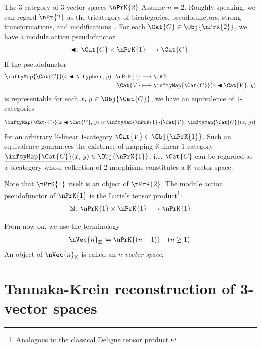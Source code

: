 \documentclass[TQFT_main]{subfiles}
\begin{document}
\begin{myexample}[label=ex:2PrC]{The 3-category of 3-vector spaces $\nPrK{2}$}
    Assume $n=2$.
    Roughly speaking, we can regard $\nPr{2}$ as the tricategory of bicategories, pseudofunctors, strong transformations, and modifications~\cite{Yau2020bicategory}.
    For each $\Cat{C} \in \Obj{\nPrK{2}}$, we have a module action pseudofunctor
    \begin{align}
        \btl \colon \Cat{C} \times \nPrK{1} \lto \Cat{C}.
    \end{align}
    If the pseudofunctor 
    \begin{align}
        \inftyMap{\Cat{C}} (x \btl \, \mhyphen \, ,\, y) \colon 
        \nPrK{1} &\lto \CAT, \\
        \Cat{V} &\lmto \inftyMap{\Cat{C}} (x \btl \Cat{V},\, y)
    \end{align}
    is representable for each $x,\, y \in \Obj{\Cat{C}}$, we have an equivalence of $1$-categories
    \begin{align}
        \inftyMap{\Cat{C}} (x \btl \Cat{V},\, y) \simeq \inftyMap{\nPrK{1}} \bigl(\Cat{V},\,  \underline{\inftyMap{\Cat{C}}} (x,\, y)\bigr)
    \end{align}
    for an arbitrary $\mathbb{K}$-linear $1$-category $\Cat{V} \in \Obj{\nPrK{1}}$.
    Such an equivalence guarantees the existence of mapping $\mathbb{K}$-linear $1$-category $\underline{\inftyMap{\Cat{C}}}(x,\, y) \in \Obj{\nPrK{1}}$.
    i.e. $\Cat{C}$ can be regarded as a bicategory whose collection of 2-morphisms constitutes a $\mathbb{K}$-vector space.

    Note that $\nPrK{1}$ itself is an object of $\nPrK{2}$.
    The module action pseudofunctor of $\nPrK{1}$ is the Lurie's tensor product\footnote{Analogous to the classical Deligne tensor product.}:
    \begin{align}
        \boxtimes \colon \nPrK{1} \times \nPrK{1} \lto \nPrK{1}
    \end{align}
\end{myexample}

\begin{marker}
    From now on, we use the terminology
    \begin{align}
        \nVec{n}_{\mathbb{K}} \coloneqq \nPrK{(n-1)}\quad (n \ge 1).
    \end{align}
    An object of $\nVec{n}_{\mathbb{K}}$ is called an \emph{$n$-vector space}.
\end{marker}

\section{Tannaka-Krein reconstruction of 3-vector spaces}
\end{document}

